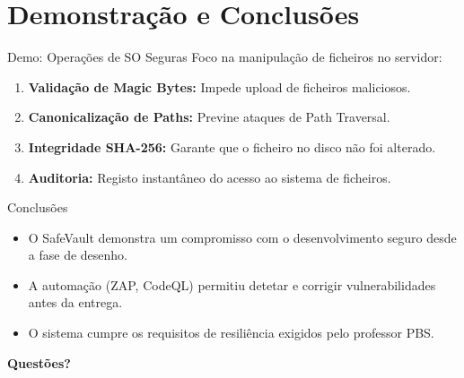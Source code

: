 \documentclass[aspectratio=169]{beamer}
\begin{document}
\section{Demonstração e Conclusões}
\begin{frame}{Demo: Operações de SO Seguras}
    Foco na manipulação de ficheiros no servidor:
    \begin{enumerate}
        \item \textbf{Validação de Magic Bytes:} Impede upload de ficheiros maliciosos.
        \item \textbf{Canonicalização de Paths:} Previne ataques de Path Traversal.
        \item \textbf{Integridade SHA-256:} Garante que o ficheiro no disco não foi alterado.
        \item \textbf{Auditoria:} Registo instantâneo do acesso ao sistema de ficheiros.
    \end{enumerate}
\end{frame}

\begin{frame}{Conclusões}
    \begin{itemize}
        \item O SafeVault demonstra um compromisso com o desenvolvimento seguro desde a fase de desenho.
        \item A automação (ZAP, CodeQL) permitiu detetar e corrigir vulnerabilidades antes da entrega.
        \item O sistema cumpre os requisitos de resiliência exigidos pelo professor PBS.
    \end{itemize}
    \vspace{0.5cm}
    \centering
    \textbf{Questões?}
\end{frame}
\end{document}
